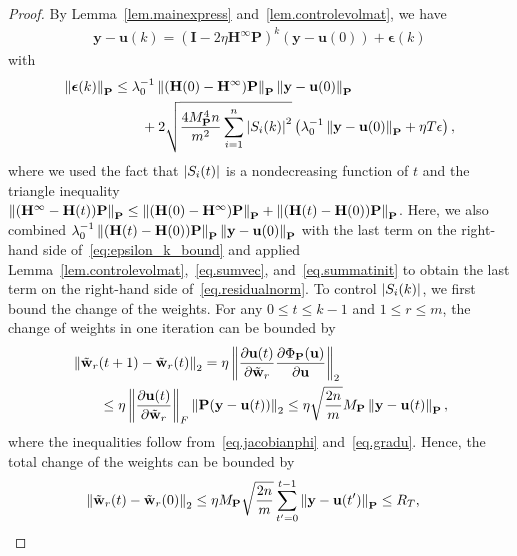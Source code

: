 \begin{proof}
By Lemma~\ref{lem.mainexpress} and~\ref{lem.controlevolmat}, we have
\begin{align*}
    \mathbf{y} - \mathbf{u}(k) = \left(\mathbf{I} - 2\eta \mathbf{H}^\infty\mathbf{P}\right)^k (\mathbf{y} - \mathbf{u}(0)) + \boldsymbol{\epsilon}(k)
\end{align*}
with
\begin{equation}\label{eq.residualnorm}
    \begin{aligned}
    \left\lVert\boldsymbol{\epsilon}(k)\right\rVert_{\mathbf{P}} &\leq \lambda_0^{-1} \left\lVert(\mathbf{H}(0)-\mathbf{H}^\infty)\mathbf{P}\right\rVert_{\mathbf{P}}  \left\lVert\mathbf{y} - \mathbf{u}(0)\right\rVert_{\mathbf{P}} \\
    &\qquad + 2\sqrt{\frac{4 M_{\mathbf{P}}^4 n}{m^2} \sum_{i=1}^n \left|S_i(k)\right|^2} \left(\lambda_0^{-1} \left\lVert\mathbf{y} - \mathbf{u}(0)\right\rVert_{\mathbf{P}} + \eta T\epsilon\right),
    \end{aligned}
\end{equation}
where we used the fact that $\left|S_i(t)\right|$ is a nondecreasing function of $t$ and the triangle inequality  $\left\lVert(\mathbf{H}^\infty-\mathbf{H}(t))\mathbf{P}\right\rVert_{\mathbf{P}} \leq \left\lVert(\mathbf{H}(0)-\mathbf{H}^\infty)\mathbf{P}\right\rVert_{\mathbf{P}} + \left\lVert(\mathbf{H}(t)-\mathbf{H}(0))\mathbf{P}\right\rVert_{\mathbf{P}}$. Here, we also combined $\lambda_0^{-1} \left\lVert(\mathbf{H}(t)-\mathbf{H}(0))\mathbf{P}\right\rVert_{\mathbf{P}} \left\lVert\mathbf{y} - \mathbf{u}(0)\right\rVert_{\mathbf{P}}$ with the last term on the right-hand side of~\cref{eq:epsilon_k_bound} and applied Lemma~\ref{lem.controlevolmat},~\cref{eq.sumvec}, and~\cref{eq.summatinit} to obtain the last term on the right-hand side of~\cref{eq.residualnorm}. To control $\left|S_i(k)\right|$, we first bound the change of the weights. For any $0 \leq t \leq k-1$ and $1\leq r\leq m$, the change of weights in one iteration can be bounded by
\begin{align*}
    &\left\lVert\tilde{\mathbf{w}}_r(t+1) - \tilde{\mathbf{w}}_r(t)\right\rVert_2 = \eta\left\lVert\frac{\partial \mathbf{u}(t)}{\partial \tilde{\mathbf{w}}_r} \frac{\partial \Phi_\mathbf{P}(\mathbf{u})}{\partial \mathbf{u}}\right\rVert_2 \\
    &\qquad\leq \eta \left\lVert\frac{\partial \mathbf{u}(t)}{\partial \tilde{\mathbf{w}}_r}\right\rVert_F \left\lVert\mathbf{P}(\mathbf{y} - \mathbf{u}(t))\right\rVert_2 \leq \eta \sqrt{\frac{2n}{m}} M_{\mathbf{P}} \left\lVert\mathbf{y} - \mathbf{u}(t)\right\rVert_{\mathbf{P}},
\end{align*}
where the inequalities follow from~\cref{eq.jacobianphi} and~\cref{eq.gradu}. Hence, the total change of the weights can be bounded by
\begin{equation}\label{eq.defineR}
\begin{aligned}
\norm{\tilde{\mathbf{w}}_r(t) - \tilde{\mathbf{w}}_r(0)}_2 & \leq \eta M_{\mathbf{P}} \sqrt{\frac{2n}{m}} \sum_{t' = 0}^{t-1} \normp{\mathbf{y} - \mathbf{u}(t')}\leq R_T,

\end{aligned}
\end{equation}
\end{proof}
